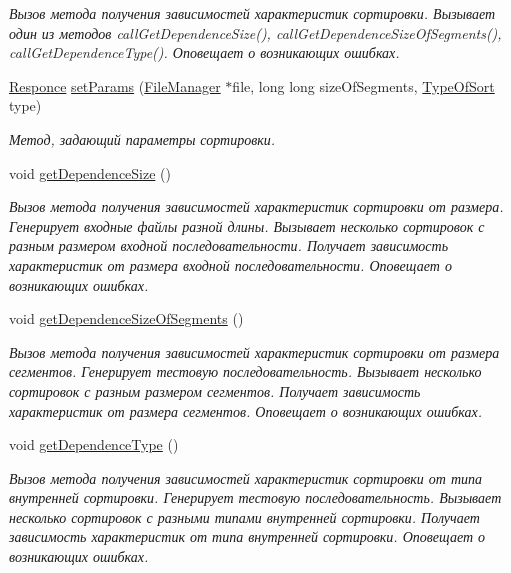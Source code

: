 \begin{DoxyCompactItemize}
\begin{DoxyCompactList}\small\item\em Вызов метода получения зависимостей характеристик сортировки. Вызывает один из методов call\+Get\+Dependence\+Size(), call\+Get\+Dependence\+Size\+Of\+Segments(), call\+Get\+Dependence\+Type(). Оповещает о возникающих ошибках. \end{DoxyCompactList}\item 
\hyperlink{_structures_8h_a9864d6ef28dd6e38416afac4426b3491}{Responce} \hyperlink{class_user_interface_a595a469d83a351719c75c65fbf4a6fbe}{set\+Params} (\hyperlink{class_file_manager}{File\+Manager} $\ast$file, long long size\+Of\+Segments, \hyperlink{_structures_8h_adbb15722785daaf5166f7ea34323854c}{Type\+Of\+Sort} type)
\begin{DoxyCompactList}\small\item\em Метод, задающий параметры сортировки. \end{DoxyCompactList}\item 
void \hyperlink{class_user_interface_af7c9d93ec693f70dcfbdd9e6a080abc7}{get\+Dependence\+Size} ()
\begin{DoxyCompactList}\small\item\em Вызов метода получения зависимостей характеристик сортировки от размера. Генерирует входные файлы разной длины. Вызывает несколько сортировок с разным размером входной последовательности. Получает зависимость характеристик от размера входной последовательности. Оповещает о возникающих ошибках. \end{DoxyCompactList}\item 
void \hyperlink{class_user_interface_aaac8a635efdb79276275f9d1ea265cd7}{get\+Dependence\+Size\+Of\+Segments} ()
\begin{DoxyCompactList}\small\item\em Вызов метода получения зависимостей характеристик сортировки от размера сегментов. Генерирует тестовую последовательность. Вызывает несколько сортировок с разным размером сегментов. Получает зависимость характеристик от размера сегментов. Оповещает о возникающих ошибках. \end{DoxyCompactList}\item 
void \hyperlink{class_user_interface_ab726cdce7e7518aae70cf42594139589}{get\+Dependence\+Type} ()
\begin{DoxyCompactList}\small\item\em Вызов метода получения зависимостей характеристик сортировки от типа внутренней сортировки. Генерирует тестовую последовательность. Вызывает несколько сортировок с разными типами внутренней сортировки. Получает зависимость характеристик от типа внутренней сортировки. Оповещает о возникающих ошибках. \end{DoxyCompactList}\end{DoxyCompactItemize}
